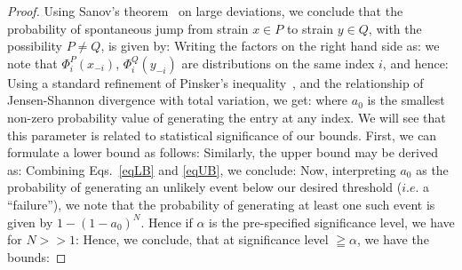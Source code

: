 \documentclass[onecolumn,10pt]{IEEEtran}
\begin{document}
\begin{proof}
  Using Sanov's theorem~\cite{cover} on large deviations, we conclude that the probability of spontaneous jump from strain $x\in P$ to strain $y\in Q$, with the possibility $P \neq Q$, is given by:
  Writing the factors on the right hand side as:
  we note that $\Phi^P_i(x_{-i})$, $\Phi^Q_i(y_{-i})$ are distributions on the same index $i$, and hence:
  Using a standard refinement of Pinsker's inequality~\cite{fedotov2003refinements}, and the relationship of Jensen-Shannon divergence with  total variation, we get:
  where $a_0$ is the smallest non-zero probability value of generating the entry at any index. We will see that this parameter is related to statistical significance of our bounds. First, we can formulate a lower bound as follows:
  Similarly,  the upper bound may be derived as:
  Combining Eqs.~\ref{eqLB} and \ref{eqUB}, we conclude:
  Now, interpreting $a_0$ as the probability of generating an unlikely event below our desired threshold ($i.e.$ a ``failure''), we note that the probability of generating at least one such event is given by $1-(1-a_0)^N$. Hence if $\alpha$ is the pre-specified significance level, we have for $N >> 1 $:
  Hence, we conclude, that at significance level $\geqq \alpha$, we have the bounds:
\end{proof}
\end{document}

